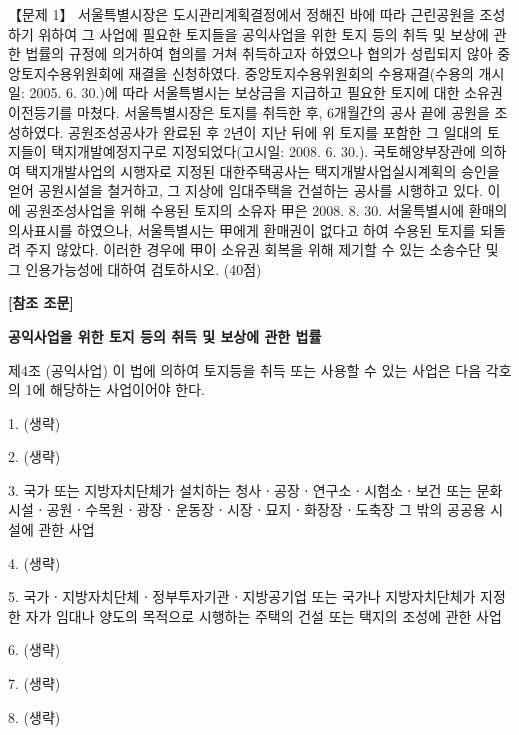 \begin{longquestion}{【문제 1】}
서울특별시장은 도시관리계획결정에서 정해진 바에 따라 근린공원을 조성하기 위하여 그 사업에 필요한 토지들을 공익사업을 위한 토지 등의 취득 및 보상에 관한 법률의 규정에 의거하여 협의를 거쳐 취득하고자 하였으나 협의가 성립되지 않아 중앙토지수용위원회에 재결을 신청하였다. 중앙토지수용위원회의 수용재결(수용의 개시일: 2005. 6. 30.)에 따라 서울특별시는 보상금을 지급하고 필요한 토지에 대한 소유권이전등기를 마쳤다. 서울특별시장은 토지를 취득한 후, 6개월간의 공사 끝에 공원을 조성하였다. 공원조성공사가 완료된 후 2년이 지난 뒤에 위 토지를 포함한 그 일대의 토지들이 택지개발예정지구로 지정되었다(고시일: 2008. 6. 30.). 국토해양부장관에 의하여 택지개발사업의 시행자로 지정된 대한주택공사는 택지개발사업실시계획의 승인을 얻어 공원시설을 철거하고, 그 지상에 임대주택을 건설하는 공사를 시행하고 있다. 이에 공원조성사업을 위해 수용된 토지의 소유자 甲은 2008. 8. 30. 서울특별시에 환매의 의사표시를 하였으나, 서울특별시는 甲에게 환매권이 없다고 하여 수용된 토지를 되돌려 주지 않았다. 이러한 경우에 甲이 소유권 회복을 위해 제기할 수 있는 소송수단 및 그 인용가능성에 대하여 검토하시오. (40점) \par
\textbf{[참조 조문]} \par
\textbf{공익사업을 위한 토지 등의 취득 및 보상에 관한 법률} \par
제4조 (공익사업) 이 법에 의하여 토지등을 취득 또는 사용할 수 있는 사업은 다음 각호의 1에 해당하는 사업이어야 한다. \par
1. (생략) \par
2. (생략) \par
3. 국가 또는 지방자치단체가 설치하는 청사ㆍ공장ㆍ연구소ㆍ시험소ㆍ보건 또는 문화시설ㆍ공원ㆍ수목원ㆍ광장ㆍ운동장ㆍ시장ㆍ묘지ㆍ화장장ㆍ도축장 그 밖의 공공용 시설에 관한 사업 \par
4. (생략) \par
5. 국가ㆍ지방자치단체ㆍ정부투자기관ㆍ지방공기업 또는 국가나 지방자치단체가 지정한 자가 임대나 양도의 목적으로 시행하는 주택의 건설 또는 택지의 조성에 관한 사업 \par
6. (생략) \par
7. (생략) \par
8. (생략) \par
\end{longquestion}
